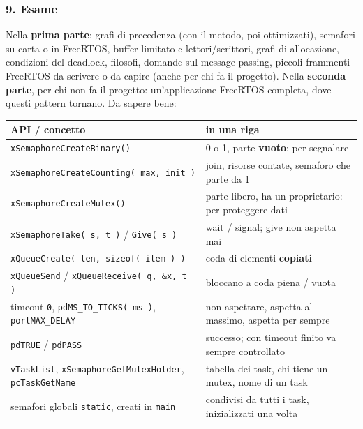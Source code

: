 \subsubsection*{9. Esame}
Nella \textbf{prima parte}: grafi di precedenza (con il metodo, poi ottimizzati), semafori su carta o in FreeRTOS, buffer limitato e lettori/scrittori, grafi di allocazione, condizioni del deadlock, filosofi, domande sul message passing, piccoli frammenti FreeRTOS da scrivere o da capire (anche per chi fa il progetto). Nella \textbf{seconda parte}, per chi non fa il progetto: un'applicazione FreeRTOS completa, dove questi pattern tornano. Da sapere bene:
\begin{center}
\small
\begin{tabular}{P{0.42} P{0.48}}
    \hline
    \textbf{API / concetto} & \textbf{in una riga} \\
    \hline
    \texttt{xSemaphoreCreateBinary()} & 0 o 1, parte \textbf{vuoto}: per segnalare \\
    \texttt{xSemaphoreCreateCounting( max, init )} & join, risorse contate, semaforo che parte da 1 \\
    \texttt{xSemaphoreCreateMutex()} & parte libero, ha un proprietario: per proteggere dati \\
    \texttt{xSemaphoreTake( s, t )} / \texttt{Give( s )} & wait / signal; give non aspetta mai \\
    \texttt{xQueueCreate( len, sizeof( item ) )} & coda di elementi \textbf{copiati} \\
    \texttt{xQueueSend} / \texttt{xQueueReceive( q, \&x, t )} & bloccano a coda piena / vuota \\
    timeout \texttt{0}, \texttt{pdMS\_TO\_TICKS( ms )}, \texttt{portMAX\_DELAY} & non aspettare, aspetta al massimo, aspetta per sempre \\
    \texttt{pdTRUE} / \texttt{pdPASS} & successo; con timeout finito va sempre controllato \\
    \texttt{vTaskList}, \texttt{xSemaphoreGetMutexHolder}, \texttt{pcTaskGetName} & tabella dei task, chi tiene un mutex, nome di un task \\
    semafori globali \texttt{static}, creati in \texttt{main} & condivisi da tutti i task, inizializzati una volta \\
    \hline
\end{tabular}
\end{center}

\makeatletter\let\@texttop\wviiiSavedTextTop\let\@textbottom\wviiiSavedTextBottom\makeatother
